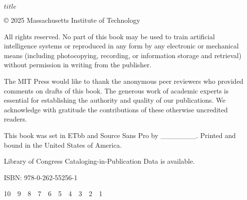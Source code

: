 \newgeometry{}

\begin{titlepage}
\end{titlepage}

\begin{titlepage}
  \centering
  {\scshape\Huge $title$\par}\clearpage
\end{titlepage}


\begin{titlepage}
  \vspace*{\fill}
  {\rmfamily\scriptsize
    © 2025 Massachusetts Institute of Technology\par
    All rights reserved. No part of this book may be used to train artificial intelligence systems or reproduced in any form by any electronic or mechanical means (including photocopying, recording, or information storage and retrieval) without permission in writing from the publisher.\par
    The MIT Press would like to thank the anonymous peer reviewers who provided comments on drafts of this book. The generous work of academic experts is essential for establishing the authority and quality of our publications. We acknowledge with gratitude the contributions of these otherwise uncredited readers.\par
    This book was set in ETbb and Source Sans Pro by \_\_\_\_\_\_\_. Printed and bound in the United States of America.\par
    Library of Congress Cataloging-in-Publication Data is available.\par
    ISBN: 978-0-262-55256-1\par
    10 9 8 7 6 5 4 3 2 1\par
  }
  \vspace*{\fill}
\end{titlepage}

\restoregeometry{}
